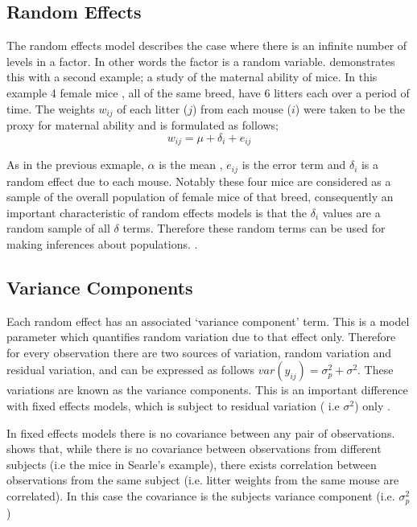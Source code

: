 \documentclass[12pt, a4paper]{report}
\begin{document}
\subsection{Random Effects}
The random effects model describes the case where there is an
infinite number of levels in a factor. In other words the factor
is a random variable. \citet{Searle} demonstrates this with a
second example; a study of the maternal ability of mice. In this
example 4 female mice , all of the same breed, have 6 litters each
over a period of time. The weights $w_{ij}$ of each litter ($j$)
from each mouse ($i$) were taken to be the proxy for maternal
ability and is formulated as follows;
\begin{equation}
w_{ij} = \mu + \delta_{i} + e_{ij}
\end{equation}

As in the previous exmaple, $\alpha$ is the mean , $e_{ij}$ is the
error term and $\delta_{i}$ is a random effect due to each mouse.
Notably these four mice are considered as a sample of the overall
population of female mice of that breed, consequently an important
characteristic of random effects models is that the $\delta_{i}$
values are a random sample of all $\delta$ terms. Therefore these
random terms can be used for making inferences about populations.
\citep{McCullSearle}.

\subsection{Variance Components}
Each random effect has an associated `variance component' term.
This is a model parameter which quantifies random variation due to
that effect only. Therefore for every observation there are two
sources of variation, random variation and residual variation, and
can be expressed as follows $var(y_{ij})=\sigma^{2}_{p} +
\sigma^{2}$. These variations are known as the variance
components. This is an important difference with fixed effects
models, which is subject to residual variation ( i.e $\sigma^{2}$)
only \citep{BrownPrescott}.

In fixed effects models there is no covariance between any pair of
observations. \citet*{BrownPrescott} shows that, while there is no
covariance between observations from different subjects (i.e the
mice in Searle's example), there exists correlation between
observations from the same subject (i.e. litter weights from the
same mouse are correlated). In this case the covariance is the
subjects variance component (i.e. $\sigma^{2}_{p}$)
\end{document}
